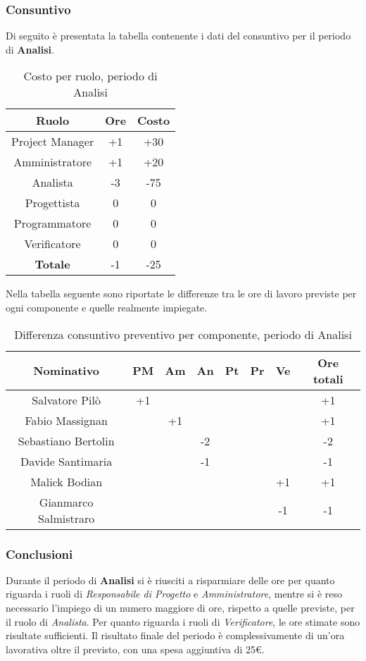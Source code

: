 	\subsubsection{Consuntivo}
	Di seguito è presentata la tabella contenente i dati del consuntivo per il periodo di \textbf{Analisi}.
	\begin{table}[H]
		\centering
		\begin{tabular}{|c|c|c|}
			\hline
			\textbf{Ruolo}		& \textbf{Ore}	& \textbf{Costo} \\
			\hline
			Project Manager		& +1		& +30	\\
			Amministratore		& +1		& +20	\\
			Analista			& -3		& -75	\\
			Progettista			& 0			& 0	\\
			Programmatore		& 0			& 0	\\
			Verificatore		& 0			& 0	\\
			\hline
			\textbf{Totale}		& -1		& -25	\\
			\hline
		\end{tabular}
		\caption{Costo per ruolo, periodo di Analisi}
	\end{table}
	Nella tabella seguente sono riportate le differenze tra le ore di lavoro previste per ogni componente e quelle realmente impiegate.
	\begin{table}[H]
		\centering
		\begin{tabular}{|c|c|c|c|c|c|c|c|}
			\hline
			\textbf{Nominativo}		& \textbf{PM}	& \textbf{Am}	& \textbf{An}	& \textbf{Pt}	& \textbf{Pr}	& \textbf{Ve}	& \textbf{Ore totali}     \\
			\hline
			Salvatore Pilò			& +1	& 		& 		&		&		&		& +1 \\
			Fabio Massignan			&		& +1	&		&		&		& 		& +1 \\
			Sebastiano Bertolin		&		& 	 	& -2	&		&		&		& -2 \\
			Davide Santimaria		&		& 		& -1	&		&		&		& -1 \\
			Malick Bodian			& 		&		&		&		&		& +1	& +1 \\
			Gianmarco Salmistraro	&		&		& 	 	&		&		& -1	& -1 \\
			\hline
		\end{tabular}
		\caption{Differenza consuntivo preventivo per componente, periodo di Analisi}
	\end{table}
	\subsubsection{Conclusioni}
	Durante il periodo di \textbf{Analisi} si è riusciti a risparmiare delle ore per quanto riguarda i ruoli di \textit{Responsabile di Progetto} e \textit{Amministratore}, mentre si è reso necessario l'impiego di un numero maggiore di ore, rispetto a quelle previste, per il ruolo di \textit{Analista}. Per quanto riguarda i ruoli di \textit{Verificatore}, le ore stimate sono risultate sufficienti. Il risultato finale del periodo è complessivamente di un'ora lavorativa oltre il previsto, con una spesa aggiuntiva di 25€.
